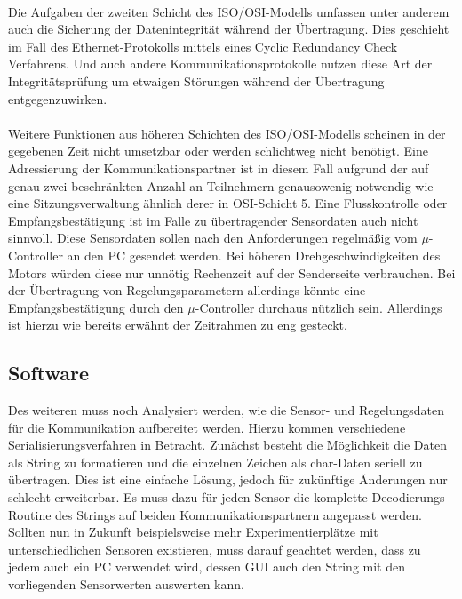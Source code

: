 \paragraph{}
Die Aufgaben der zweiten Schicht des ISO/OSI-Modells umfassen unter anderem auch die Sicherung der Datenintegrität während der Übertragung. Dies geschieht im Fall des Ethernet-Protokolls mittels eines Cyclic Redundancy Check Verfahrens. Und auch andere Kommunikationsprotokolle nutzen diese Art der Integritätsprüfung um etwaigen Störungen während der Übertragung entgegenzuwirken.
\paragraph{}
Weitere Funktionen aus höheren Schichten des ISO/OSI-Modells scheinen in der gegebenen Zeit nicht umsetzbar oder werden schlichtweg nicht benötigt. Eine Adressierung der Kommunikationspartner ist in diesem Fall aufgrund der auf genau zwei beschränkten Anzahl an Teilnehmern genausowenig notwendig wie eine Sitzungsverwaltung ähnlich derer in OSI-Schicht 5. Eine Flusskontrolle oder Empfangsbestätigung ist im Falle zu übertragender Sensordaten auch nicht sinnvoll. Diese Sensordaten sollen nach den Anforderungen regelmäßig vom $\mu$-Controller an den PC gesendet werden. Bei höheren Drehgeschwindigkeiten des Motors würden diese nur unnötig Rechenzeit auf der Senderseite verbrauchen. Bei der Übertragung von Regelungsparametern allerdings könnte eine Empfangsbestätigung durch den $\mu$-Controller durchaus nützlich sein. Allerdings ist hierzu wie bereits erwähnt der Zeitrahmen zu eng gesteckt.
\subsection{Software}
Des weiteren muss noch Analysiert werden, wie die Sensor- und Regelungsdaten für die Kommunikation aufbereitet werden. Hierzu kommen verschiedene Serialisierungsverfahren in Betracht. Zunächst besteht die Möglichkeit die Daten als String zu formatieren und die einzelnen Zeichen als char-Daten seriell zu übertragen. Dies ist eine einfache Lösung, jedoch für zukünftige Änderungen nur schlecht erweiterbar. Es muss dazu für jeden Sensor die komplette Decodierungs-Routine des Strings auf beiden Kommunikationspartnern angepasst werden. Sollten nun in Zukunft beispielsweise mehr Experimentierplätze mit unterschiedlichen Sensoren existieren, muss darauf geachtet werden, dass zu jedem auch ein PC verwendet wird, dessen GUI auch den String mit den vorliegenden Sensorwerten auswerten kann.

